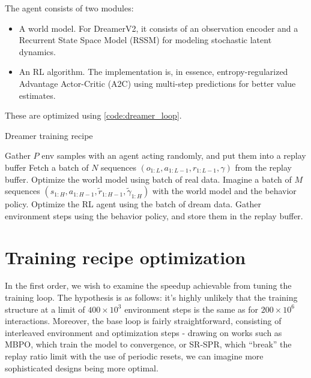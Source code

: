 \documentclass[twoside,11pt]{article}
\begin{document}
The agent consists of two modules:

\begin{itemize}
  \item A world model. For DreamerV2, it consists of an observation encoder and a Recurrent State Space Model (RSSM) for modeling stochastic latent dynamics.
  \item An RL algorithm. The implementation is, in essence, entropy-regularized Advantage Actor-Critic (A2C) using multi-step predictions for better value estimates.
\end{itemize}

These are optimized using \autoref{code:dreamer_loop}.

\begin{algorithm}
  \caption{Dreamer training recipe}
  \label{code:dreamer_loop}
  \begin{algorithmic}[1]
    \State Gather $P$ env samples with an agent acting randomly, and put them into a replay buffer
    \State Fetch a batch of $N$ sequences $(o_{1:L}, a_{1:L-1}, r_{1:L-1}, \gamma)$ from the replay buffer.
    \State Optimize the world model using batch of real data.
    \State Imagine a batch of $M$ sequences $(s_{1:H}, a_{1:H-1}, \widetilde{r}_{1:H-1}, \widetilde{\gamma}_{1:H})$ with the world model and the behavior policy.
    \State Optimize the RL agent using the batch of dream data.
    \State Gather environment steps using the behavior policy, and store them in the replay buffer.
    \EndWhile
  \end{algorithmic}
\end{algorithm}

\section{Training recipe optimization}

In the first order, we wish to examine the speedup achievable from tuning the training loop. The hypothesis is as follows: it's highly unlikely that the training structure at a limit of $400 \times 10^3$ environment steps is the same as for $200 \times 10^6$ interactions. Moreover, the base loop is fairly straightforward, consisting of interleaved environment and optimization steps - drawing on works such as MBPO, which train the model to convergence, or SR-SPR, which ``break'' the replay ratio limit with the use of periodic resets, we can imagine more sophisticated designs being more optimal.
\end{document}
